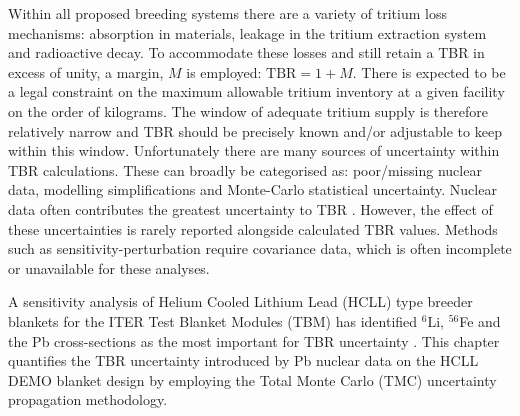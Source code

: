 
Within all proposed breeding systems there are a variety of tritium loss mechanisms: absorption in materials, leakage in the tritium extraction system and radioactive decay. To accommodate these losses and still retain a TBR in excess of unity, a margin, $M$ is employed: $\mathrm{TBR} = 1 + M$. There is expected to be a legal constraint on the maximum allowable tritium inventory at a given facility on the order of kilograms. The window of adequate tritium supply is therefore relatively narrow and TBR should be precisely known and/or adjustable to keep within this window. Unfortunately there are many sources of uncertainty within TBR calculations. These can broadly be categorised as: poor/missing nuclear data, modelling simplifications and Monte-Carlo statistical uncertainty. Nuclear data often contributes the greatest uncertainty to TBR \cite{El-Guebaly2009}. However, the effect of these uncertainties is rarely reported alongside calculated TBR values. Methods such as sensitivity-perturbation require covariance data, which is often incomplete or unavailable for these analyses.


A sensitivity analysis of Helium Cooled Lithium Lead (HCLL)  type breeder blankets for the ITER Test Blanket Modules (TBM) has identified $^{6}$Li, $^{56}$Fe and the Pb cross-sections as the most important for TBR uncertainty \cite{Leichtle2011}. This chapter quantifies the TBR uncertainty introduced by Pb nuclear data on the HCLL DEMO blanket design by employing the Total Monte Carlo (TMC) uncertainty propagation methodology.


